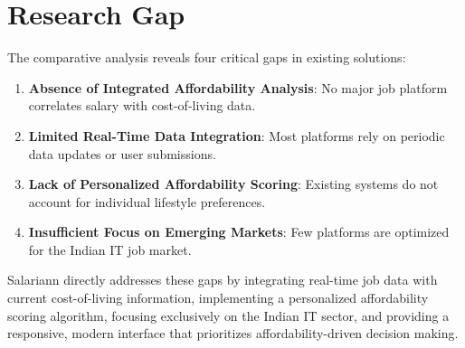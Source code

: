 \documentclass[12pt,a4paper,oneside]{report}
\begin{document}
\section{Research Gap}

The comparative analysis reveals four critical gaps in existing solutions:

\begin{enumerate}
    \item \textbf{Absence of Integrated Affordability Analysis}: No major job platform correlates salary with cost-of-living data.
    
    \item \textbf{Limited Real-Time Data Integration}: Most platforms rely on periodic data updates or user submissions.
    
    \item \textbf{Lack of Personalized Affordability Scoring}: Existing systems do not account for individual lifestyle preferences.
    
    \item \textbf{Insufficient Focus on Emerging Markets}: Few platforms are optimized for the Indian IT job market.
\end{enumerate}

Salariann directly addresses these gaps by integrating real-time job data with current cost-of-living information, implementing a personalized affordability scoring algorithm, focusing exclusively on the Indian IT sector, and providing a responsive, modern interface that prioritizes affordability-driven decision making.
\end{document}
